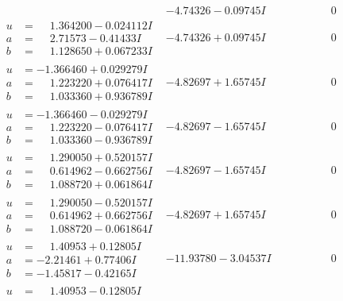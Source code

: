 \documentclass[1p]{elsarticle_modified}
\theoremstyle{definition}
\begin{document}
$$\begin{array}{c|c|c}
 & -4.74326 - 0.09745 I & \phantom{-0.000000 } 0 \\ \hline\begin{aligned}
u &= \phantom{-}1.364200 - 0.024112 I \\
a &= \phantom{-}2.71573 - 0.41433 I \\
b &= \phantom{-}1.128650 + 0.067233 I\end{aligned}
 & -4.74326 + 0.09745 I & \phantom{-0.000000 } 0 \\ \hline\begin{aligned}
u &= -1.366460 + 0.029279 I \\
a &= \phantom{-}1.223220 + 0.076417 I \\
b &= \phantom{-}1.033360 + 0.936789 I\end{aligned}
 & -4.82697 + 1.65745 I & \phantom{-0.000000 } 0 \\ \hline\begin{aligned}
u &= -1.366460 - 0.029279 I \\
a &= \phantom{-}1.223220 - 0.076417 I \\
b &= \phantom{-}1.033360 - 0.936789 I\end{aligned}
 & -4.82697 - 1.65745 I & \phantom{-0.000000 } 0 \\ \hline\begin{aligned}
u &= \phantom{-}1.290050 + 0.520157 I \\
a &= \phantom{-}0.614962 - 0.662756 I \\
b &= \phantom{-}1.088720 + 0.061864 I\end{aligned}
 & -4.82697 - 1.65745 I & \phantom{-0.000000 } 0 \\ \hline\begin{aligned}
u &= \phantom{-}1.290050 - 0.520157 I \\
a &= \phantom{-}0.614962 + 0.662756 I \\
b &= \phantom{-}1.088720 - 0.061864 I\end{aligned}
 & -4.82697 + 1.65745 I & \phantom{-0.000000 } 0 \\ \hline\begin{aligned}
u &= \phantom{-}1.40953 + 0.12805 I \\
a &= -2.21461 + 0.77406 I \\
b &= -1.45817 - 0.42165 I\end{aligned}
 & -11.93780 - 3.04537 I & \phantom{-0.000000 } 0 \\ \hline\begin{aligned}
u &= \phantom{-}1.40953 - 0.12805 I \\

\end{aligned}
\end{array}$$
\end{document}
